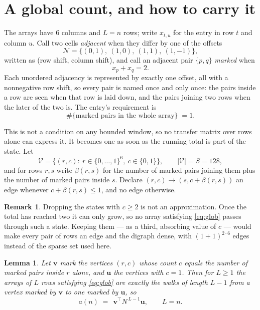 \documentclass[11pt,a4paper]{article}
\theoremstyle{plain}
\newtheorem{lemma}[theorem]{Lemma}
\theoremstyle{definition}
\newtheorem{remark}[theorem]{Remark}
\begin{document}
\section{A global count, and how to carry it}

The arrays have $6$ columns and $L=n$ rows; write $x_{t,u}$ for the entry in
row $t$ and column $u$. Call two cells \emph{adjacent} when they differ by one of the
offsets
\[
\mathcal N=\{(0,1),\ (1,0),\ (1,1),\ (1,-1)\},
\]
written as (row shift, column shift), and call an adjacent pair $\{p,q\}$
\emph{marked} when
\[
x_{p}+x_{q}=2 .
\]
Each unordered adjacency is represented by exactly one offset, all with a nonnegative row
shift, so every pair is named once and only once: the pairs inside a row are seen when
that row is laid down, and the pairs joining two rows when the later of the two is. The
entry's requirement is
\begin{equation}\label{eq:glob}
\#\{\text{marked pairs in the whole array}\}\;=1.
\end{equation}

This is not a condition on any bounded window, so no transfer matrix over rows alone can
express it. It becomes one as soon as the running total is part of the state. Let
\[
\mathcal V=\bigl\{(r,c):\ r\in\{0,\dots,1\}^{6},\ c\in\{0,1\}\bigr\},
\qquad |\mathcal V|=S=128,
\]
and for rows $r,s$ write $\beta(r,s)$ for the number of marked pairs joining them plus the
number of marked pairs inside $s$. Declare $(r,c)\to(s,c+\beta(r,s))$ an edge whenever
$c+\beta(r,s)\le1$, and no edge otherwise.

\begin{remark}
Dropping the states with $c\ge2$ is not an approximation. Once the total has reached two it
can only grow, so no array satisfying \eqref{eq:glob} passes through such a state. Keeping
them --- as a third, absorbing value of $c$ --- would make every pair of rows an edge and
the digraph dense, with $(1+1)^{2\cdot6}$ edges instead of the sparse set used here.
\end{remark}

\begin{lemma}\label{lem:walk}
Let $\mathbf{v}$ mark the vertices $(r,c)$ whose count $c$ equals the number of marked pairs
inside $r$ alone, and $\mathbf{u}$ the vertices with $c=1$. Then for $L\ge1$ the arrays
of $L$ rows satisfying \eqref{eq:glob} are exactly the walks of length $L-1$ from a
vertex marked by $\mathbf{v}$ to one marked by $\mathbf{u}$, so
\[
a(n)\;=\;\,\mathbf{v}^{\!\top}N^{\,L-1}\mathbf{u},\qquad L=n .
\]
\end{lemma}
\end{document}
